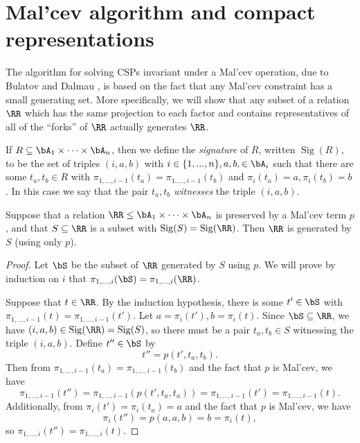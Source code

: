 \section{Mal'cev algorithm and compact representations}\label{s-malcev-algorithm}

The algorithm for solving CSPs invariant under a Mal'cev operation, due to Bulatov and Dalmau \cite{bulatov-dalmau-malcev}, is based on the fact that any Mal'cev constraint has a small generating set. More specifically, we will show that any subset of a relation $\RR$ which has the same projection to each factor and contains representatives of all of the ``forks'' of $\RR$ actually generates $\RR$.

\begin{defn} If $R \subseteq \bA_1 \times \cdots \times \bA_n$, then we define the \emph{signature} of $R$, written $\operatorname{Sig}(R)$, to be the set of triples $(i,a,b)$ with $i \in \{1, ..., n\}, a,b, \in \bA_i$ such that there are some $t_a,t_b \in R$ with $\pi_{1, ..., i-1}(t_a) = \pi_{1, ..., i-1}(t_b)$ and $\pi_i(t_a) = a, \pi_i(t_b) = b$. In this case we say that the pair $t_a,t_b$ \emph{witnesses} the triple $(i,a,b)$.
\end{defn}

\begin{thm}\label{malcev-compact} Suppose that a relation $\RR \le \bA_1 \times \cdots \times \bA_n$ is preserved by a Mal'cev term $p$, and that $S \subseteq \RR$ is a subset with $\operatorname{Sig}(S) = \operatorname{Sig}(\RR)$. Then $\RR$ is generated by $S$ (using only $p$).
\end{thm}
\begin{proof} Let $\bS$ be the subset of $\RR$ generated by $S$ using $p$. We will prove by induction on $i$ that $\pi_{1, ..., i}(\bS) = \pi_{1, ..., i}(\RR)$.

Suppose that $t \in \RR$. By the induction hypothesis, there is some $t' \in \bS$ with $\pi_{1, ...,i-1}(t) = \pi_{1, ..., i-1}(t')$. Let $a = \pi_i(t'), b = \pi_i(t)$. Since $\bS \subseteq \RR$, we have $(i,a,b) \in \operatorname{Sig}(\RR) = \operatorname{Sig}(S)$, so there must be a pair $t_a, t_b \in S$ witnessing the triple $(i,a,b)$. Define $t'' \in \bS$ by
\[
t'' = p(t',t_a,t_b).
\]
Then from $\pi_{1, ...,i-1}(t_a) = \pi_{1, ..., i-1}(t_b)$ and the fact that $p$ is Mal'cev, we have
\[
\pi_{1, ...,i-1}(t'') = \pi_{1, ...,i-1}(p(t',t_a,t_a)) = \pi_{1, ...,i-1}(t') = \pi_{1, ...,i-1}(t).
\]
Additionally, from $\pi_i(t') = \pi_i(t_a) = a$ and the fact that $p$ is Mal'cev, we have
\[
\pi_i(t'') = p(a,a,b) = b = \pi_i(t),
\]
so $\pi_{1, ..., i}(t'') = \pi_{1, ..., i}(t)$.
\end{proof}


